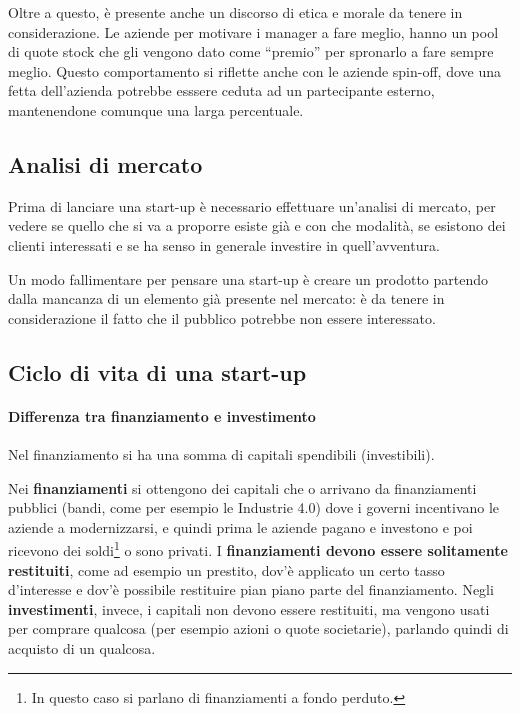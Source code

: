 Oltre a questo, è presente anche un discorso di etica e morale da tenere in
considerazione.
Le aziende per motivare i manager a fare meglio, hanno un pool di quote stock
che gli vengono dato come ``premio'' per spronarlo a fare sempre meglio. Questo
comportamento si riflette anche con le aziende spin-off, dove una fetta
dell'azienda potrebbe esssere ceduta ad un partecipante esterno, mantenendone
comunque una larga percentuale.

\subsection{Analisi di mercato}

Prima di lanciare una start-up è necessario effettuare un'analisi di mercato,
per vedere se quello che si va a proporre esiste già e con che modalità, se
esistono dei clienti interessati e se ha senso in generale investire in
quell'avventura.

Un modo fallimentare per pensare una start-up è creare un prodotto partendo
dalla mancanza di un elemento già presente nel mercato: è da tenere in
considerazione il fatto che il pubblico potrebbe non essere interessato.

\subsection{Ciclo di vita di una start-up}

\paragraph*{Differenza tra finanziamento e investimento} Nel finanziamento si
ha una somma di capitali spendibili (investibili).

Nei \textbf{finanziamenti} si ottengono dei capitali che o arrivano da
finanziamenti pubblici (bandi, come per esempio le Industrie 4.0) dove i governi
incentivano le aziende a modernizzarsi, e quindi prima le aziende pagano e
investono e poi ricevono dei soldi\footnote{In questo caso si parlano di
finanziamenti a
fondo perduto.} o sono privati. I \textbf{finanziamenti devono essere
solitamente restituiti}, come ad esempio un prestito, dov'è applicato un certo
tasso d'interesse e dov'è possibile restituire pian piano parte del
finanziamento.
Negli \textbf{investimenti}, invece, i capitali non devono essere restituiti,
ma vengono usati per comprare qualcosa (per esempio azioni o quote societarie),
parlando quindi di acquisto di un qualcosa.\\[0.3cm]


